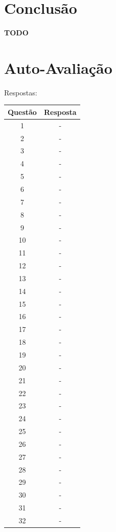 \documentclass[12pt]{article}
\begin{document}
\section{Conclusão}\label{sec:Conclusao}

\textbf{TODO}




\newpage
\section*{Auto-Avaliação}

Respostas:

\begin{table}[H]
      \begin{tabular}{|c|c|} \hline
      \textbf{Questão} & \textbf{Resposta}\\
      \hline
      1   & - \\ \hline
      2   & - \\ \hline
      3   & - \\ \hline
      4   & - \\ \hline
      5   & - \\ \hline
      6   & - \\ \hline
      7   & - \\ \hline
      8   & - \\ \hline
      9   & - \\ \hline
      10  & - \\ \hline
      11  & - \\ \hline
      12  & - \\ \hline
      13  & - \\ \hline
      14  & - \\ \hline
      15  & - \\ \hline
      16  & - \\ \hline
      17  & - \\ \hline
      18  & - \\ \hline
      19  & - \\ \hline
      20  & - \\ \hline
      21  & - \\ \hline
      22  & - \\ \hline
      23  & - \\ \hline
      24  & - \\ \hline
      25  & - \\ \hline
      26  & - \\ \hline
      27  & - \\ \hline
      28  & - \\ \hline
      29  & - \\ \hline
      30  & - \\ \hline
      31  & - \\ \hline
      32  & - \\ \hline
      \end{tabular}
\end{table}
\end{document}
